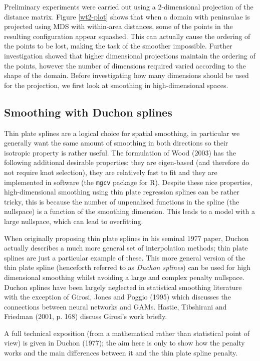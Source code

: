 \documentclass[useAMS, referee]{biom}
\begin{document}
Preliminary experiments were carried out using a 2-dimensional projection of the distance matrix. Figure \ref{wt2-plot} shows that when a domain with peninsulae is projected using MDS with within-area distances, some of the points in the resulting configuration appear squashed. This can actually cause the ordering of the points to be lost, making the task of the smoother impossible. Further investigation showed that higher dimensional projections maintain the ordering of the points, however the number of dimensions required varied according to the shape of the domain. Before investigating how many dimensions should be used for the projection, we first look at smoothing in high-dimensional spaces.

\subsection{Smoothing with Duchon splines}
\label{ss:duchon}

Thin plate splines are a logical choice for spatial smoothing, in particular we generally want the same amount of smoothing in both directions so their isotropic property is rather useful. The formulation of Wood (2003) has the following additional desirable properties: they are eigen-based (and therefore do not require knot selection), they are relatively fast to fit and they are implemented in software (the \texttt{mgcv} package for \textsf{R}). Despite these nice properties, high-dimensional smoothing using thin plate regression splines can be rather tricky, this is because the number of unpenalised functions in the spline (the nullspace) is a function of the smoothing dimension. This leads to a model with a large nullspace, which can lead to overfitting.

When originally proposing thin plate splines in his seminal 1977 paper, Duchon actually describes a much more general set of interpolation methods; thin plate splines are just a particular example of these. This more general version of the thin plate spline (henceforth referred to as \textit{Duchon splines}) can be used for high dimensional smoothing whilst avoiding a large and complex penalty nullspace. Duchon splines have been largely neglected in statistical smoothing literature with the exception of Girosi, Jones and Poggio (1995) which discusses the connections between neural networks and GAMs. Hastie, Tibshirani and Friedman (2001, p. 168) discuss Girosi's work briefly.

A full technical exposition (from a mathematical rather than statistical point of view) is given in Duchon (1977); the aim here is only to show how the penalty works and the main differences between it and the thin plate spline penalty. 
\end{document}
